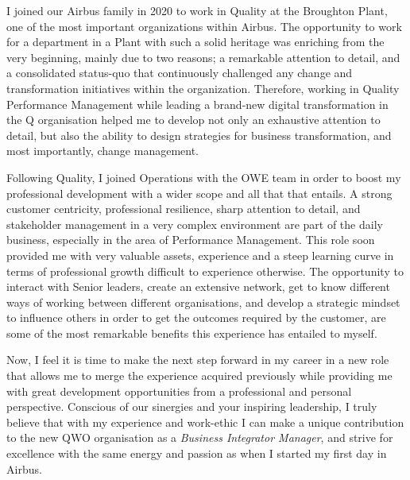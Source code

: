 \documentclass[11pt,a4paper]{letter}
\begin{document}
{\setlength{\parindent}{5mm}
  

I joined our Airbus family in 2020 to work in Quality at the Broughton Plant, one of the most important organizations within Airbus. The opportunity to work for a department in a Plant with such a solid heritage was enriching from the very beginning, mainly due to two reasons; a remarkable attention to detail, and a consolidated status-quo that continuously challenged any change and transformation initiatives within the organization. Therefore, working in Quality Performance Management while leading a brand-new digital transformation in the Q organisation helped me to develop not only an exhaustive attention to detail, but also the ability to design strategies for business transformation, and most importantly, change management.

 
Following Quality, I joined Operations with the OWE team in order to boost my professional development with a wider scope and all that that entails. A strong customer centricity, professional resilience, sharp attention to detail, and stakeholder management in a very complex environment are part of the daily business, especially in the area of Performance Management. This role soon provided me with very valuable assets, experience and a steep learning curve in terms of professional growth difficult to experience otherwise. The opportunity to interact with Senior leaders, create an extensive network, get to know different ways of working between different organisations, and develop a strategic mindset to influence others in order to get the outcomes required by the customer, are some of the most remarkable benefits this experience has entailed to myself.

Now, I feel it is time to make the next step forward in my career in a new role that allows me to merge the experience acquired previously while providing me with great development opportunities from a professional and personal perspective. Conscious of our sinergies and your inspiring leadership, I truly believe that with my experience and work-ethic I can make a unique contribution to the new QWO organisation as a \textit{Business Integrator Manager}, and strive for excellence with the same energy and passion as when I started my first day in Airbus.



}
\end{document}

